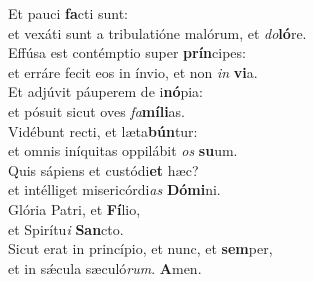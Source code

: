 \oddverse Et pauci \textbf{fa}cti sunt:~\*\\
\oddverse et vexáti sunt a tribulatióne malórum, et \textit{do}\textbf{ló}re.\\
\evenverse Effúsa est contémptio super \textbf{prín}cipes:~\*\\
\evenverse et erráre fecit eos in ínvio, et non \textit{in} \textbf{vi}a.\\
\oddverse Et adjúvit páuperem de i\textbf{nó}pia:~\*\\
\oddverse et pósuit sicut oves \textit{fa}\textbf{mí}\textbf{li}as.\\
\evenverse Vidébunt recti, et læta\textbf{bún}tur:~\*\\
\evenverse et omnis iníquitas oppilábit \textit{os} \textbf{su}um.\\
\oddverse Quis sápiens et custódi\textbf{et} hæc?~\*\\
\oddverse et intélliget misericórdi\textit{as} \textbf{Dó}\textbf{mi}ni.\\
\evenverse Glória Patri, et \textbf{Fí}lio,~\*\\
\evenverse et Spirítu\textit{i} \textbf{San}cto.\\
\oddverse Sicut erat in princípio, et nunc, et \textbf{sem}per,~\*\\
\oddverse et in sǽcula sæculó\textit{rum}. \textbf{A}men.\\
